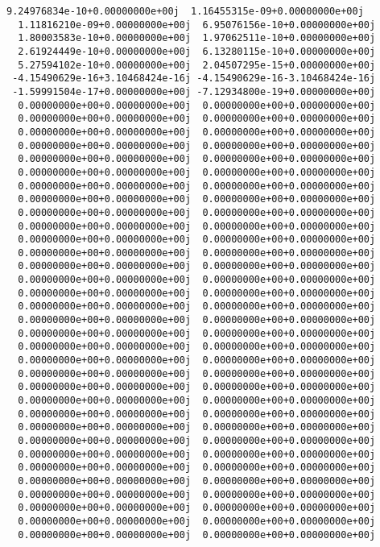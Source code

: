\documentclass[11pt]{article}
\begin{document}
\begin{Verbatim}[commandchars=\\\{\}]
  9.24976834e-10+0.00000000e+00j  1.16455315e-09+0.00000000e+00j
  1.11816210e-09+0.00000000e+00j  6.95076156e-10+0.00000000e+00j
  1.80003583e-10+0.00000000e+00j  1.97062511e-10+0.00000000e+00j
  2.61924449e-10+0.00000000e+00j  6.13280115e-10+0.00000000e+00j
  5.27594102e-10+0.00000000e+00j  2.04507295e-15+0.00000000e+00j
 -4.15490629e-16+3.10468424e-16j -4.15490629e-16-3.10468424e-16j
 -1.59991504e-17+0.00000000e+00j -7.12934800e-19+0.00000000e+00j
  0.00000000e+00+0.00000000e+00j  0.00000000e+00+0.00000000e+00j
  0.00000000e+00+0.00000000e+00j  0.00000000e+00+0.00000000e+00j
  0.00000000e+00+0.00000000e+00j  0.00000000e+00+0.00000000e+00j
  0.00000000e+00+0.00000000e+00j  0.00000000e+00+0.00000000e+00j
  0.00000000e+00+0.00000000e+00j  0.00000000e+00+0.00000000e+00j
  0.00000000e+00+0.00000000e+00j  0.00000000e+00+0.00000000e+00j
  0.00000000e+00+0.00000000e+00j  0.00000000e+00+0.00000000e+00j
  0.00000000e+00+0.00000000e+00j  0.00000000e+00+0.00000000e+00j
  0.00000000e+00+0.00000000e+00j  0.00000000e+00+0.00000000e+00j
  0.00000000e+00+0.00000000e+00j  0.00000000e+00+0.00000000e+00j
  0.00000000e+00+0.00000000e+00j  0.00000000e+00+0.00000000e+00j
  0.00000000e+00+0.00000000e+00j  0.00000000e+00+0.00000000e+00j
  0.00000000e+00+0.00000000e+00j  0.00000000e+00+0.00000000e+00j
  0.00000000e+00+0.00000000e+00j  0.00000000e+00+0.00000000e+00j
  0.00000000e+00+0.00000000e+00j  0.00000000e+00+0.00000000e+00j
  0.00000000e+00+0.00000000e+00j  0.00000000e+00+0.00000000e+00j
  0.00000000e+00+0.00000000e+00j  0.00000000e+00+0.00000000e+00j
  0.00000000e+00+0.00000000e+00j  0.00000000e+00+0.00000000e+00j
  0.00000000e+00+0.00000000e+00j  0.00000000e+00+0.00000000e+00j
  0.00000000e+00+0.00000000e+00j  0.00000000e+00+0.00000000e+00j
  0.00000000e+00+0.00000000e+00j  0.00000000e+00+0.00000000e+00j
  0.00000000e+00+0.00000000e+00j  0.00000000e+00+0.00000000e+00j
  0.00000000e+00+0.00000000e+00j  0.00000000e+00+0.00000000e+00j
  0.00000000e+00+0.00000000e+00j  0.00000000e+00+0.00000000e+00j
  0.00000000e+00+0.00000000e+00j  0.00000000e+00+0.00000000e+00j
  0.00000000e+00+0.00000000e+00j  0.00000000e+00+0.00000000e+00j
  0.00000000e+00+0.00000000e+00j  0.00000000e+00+0.00000000e+00j
  0.00000000e+00+0.00000000e+00j  0.00000000e+00+0.00000000e+00j
  0.00000000e+00+0.00000000e+00j  0.00000000e+00+0.00000000e+00j
  0.00000000e+00+0.00000000e+00j  0.00000000e+00+0.00000000e+00j
  0.00000000e+00+0.00000000e+00j  0.00000000e+00+0.00000000e+00j
  0.00000000e+00+0.00000000e+00j  0.00000000e+00+0.00000000e+00j
  0.00000000e+00+0.00000000e+00j  0.00000000e+00+0.00000000e+00j

\end{Verbatim}
\end{document}
